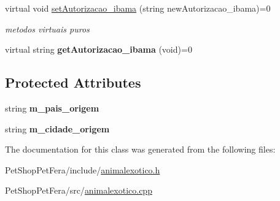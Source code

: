 \begin{DoxyCompactItemize}
\item 
\mbox{\label{class_animal_exotico_a3931a6cc8ae2d7d8e1efd6e399a63bf7}} 
virtual void \mbox{\hyperlink{class_animal_exotico_a3931a6cc8ae2d7d8e1efd6e399a63bf7}{set\+Autorizacao\+\_\+ibama}} (string new\+Autorizacao\+\_\+ibama)=0
\begin{DoxyCompactList}\small\item\em metodos virtuais puros \end{DoxyCompactList}\item 
\mbox{\label{class_animal_exotico_a4201cee2f63bcb9f93c417d7dc28db1d}} 
virtual string {\bfseries get\+Autorizacao\+\_\+ibama} (void)=0
\end{DoxyCompactItemize}
\subsection*{Protected Attributes}
\begin{DoxyCompactItemize}
\item 
\mbox{\label{class_animal_exotico_a2e1499bcba101bdba2cbe9f9e5f94b54}} 
string {\bfseries m\+\_\+pais\+\_\+origem}
\item 
\mbox{\label{class_animal_exotico_afae0f1b730e081c32771b8edc54aa311}} 
string {\bfseries m\+\_\+cidade\+\_\+origem}
\end{DoxyCompactItemize}


The documentation for this class was generated from the following files\+:\begin{DoxyCompactItemize}
\item 
Pet\+Shop\+Pet\+Fera/include/\mbox{\hyperlink{animalexotico_8h}{animalexotico.\+h}}\item 
Pet\+Shop\+Pet\+Fera/src/\mbox{\hyperlink{animalexotico_8cpp}{animalexotico.\+cpp}}\end{DoxyCompactItemize}

